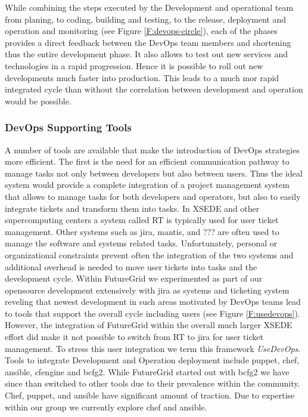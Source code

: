 \documentclass{article}
\begin{document}
While combining the steps executed by the Development and operational
team from planing, to coding, building and testing, to the release,
deployment and operation and monitoring (see Figure
\ref{F:devops-circle}), each of the phases provides a direct feedback
between the DevOps team members and shortening thus the entire
development phase. It also allows to test out new services and
technologies in a rapid progression. Hence it is possible to roll out
new developments much faster into production. This leads to a much mor
rapid integrated cycle than without the correlation between
development and operation would be possible.

\subsubsection{DevOps Supporting Tools}

A number of tools are available that make the introduction of DevOps
strategies more efficient. The first is the need for an efficient
communication pathway to manage tasks not only between developers but
also between users. Thus the ideal system would provide a complete
integration of a project management system that allows to manage tasks
for both developers and operators, but also to easily integrate
tickets and transform them into tasks. In XSEDE and other
supercomputing centers a system called RT is typically used for user
ticket management. Other systems such as jira, mantis, and ??? are
often used to manage the software and systems related
tasks. Unfortunately, personal or organizational constraints prevent
often the integration of the two systems and additional overhead is
needed to move user tickets into tasks and the development
cycle. Within FutureGrid we experimented as part of our opensource
development extensively with jira as systems and ticketing system
reveling that newest development in such areas motivated by DevOps
teams lead to tools that support the overall cycle including users
(see Figure \ref{F:usedevops}). However, the integration of
FutureGrid within the overall much larger XSEDE effort did make it not
possible to switch from RT to jira for user ticket
management. To stress this user integration we term this framework
{\em UseDevOps}. Tools to integrate Development and Operation
deployment include puppet, chef, ansible, cfengine and bcfg2. While
FutureGrid started out with bcfg2 we have since than switched to other
tools due to their prevalence within the community. Chef, puppet, and
ansible have significant amount of traction. Due to expertise within
our group we currently explore chef and ansible. 
\end{document}
